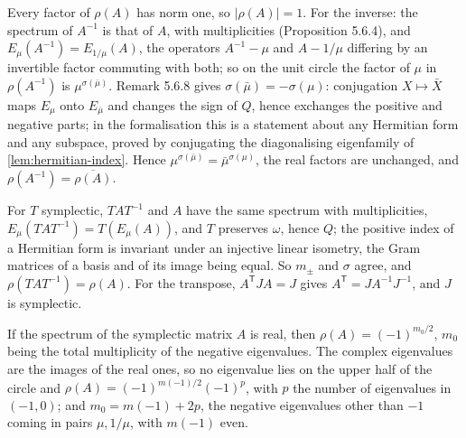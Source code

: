 \begin{proposition}[$\rho$ takes unit values, and $\rho(A^{-1}) = \overline{\rho(A)}$]
  \label{prop:rho-norm-inv}
  \leanok
  Every factor of $\rho(A)$ has norm one, so $\lvert\rho(A)\rvert = 1$.  For the
  inverse: the spectrum of $A^{-1}$ is that of $A$, with multiplicities
  (Proposition 5.6.4), and $E_\mu(A^{-1}) = E_{1/\mu}(A)$, the operators
  $A^{-1} - \mu$ and $A - 1/\mu$ differing by an invertible factor commuting
  with both; so on the unit circle the factor of $\mu$ in $\rho(A^{-1})$ is
  $\mu^{\sigma(\bar\mu)}$.  Remark 5.6.8 gives $\sigma(\bar\mu) = -\sigma(\mu)$:
  conjugation $X \mapsto \bar X$ maps $E_\mu$ onto $E_{\bar\mu}$ and changes the
  sign of $Q$, hence exchanges the positive and negative parts; in the
  formalisation this is a statement about any Hermitian form and any subspace,
  proved by conjugating the diagonalising eigenfamily of
  \ref{lem:hermitian-index}.  Hence $\mu^{\sigma(\bar\mu)} =
  \bar\mu^{\sigma(\mu)}$, the real factors are unchanged, and
  $\rho(A^{-1}) = \overline{\rho(A)}$.
\end{proposition}

\begin{proposition}[Naturality of $\rho$, and $\rho(A^{\mathsf T}) = \rho(A^{-1})$]
  \label{prop:rho-naturality}
  \leanok
  For $T$ symplectic, $TAT^{-1}$ and $A$ have the same spectrum with
  multiplicities, $E_\mu(TAT^{-1}) = T(E_\mu(A))$, and $T$ preserves $\omega$,
  hence $Q$; the positive index of a Hermitian form is invariant under an
  injective linear isometry, the Gram matrices of a basis and of its image
  being equal.  So $m_\pm$ and $\sigma$ agree, and $\rho(TAT^{-1}) = \rho(A)$.
  For the transpose, $A^{\mathsf T} J A = J$ gives
  $A^{\mathsf T} = J A^{-1} J^{-1}$, and $J$ is symplectic.
\end{proposition}

\begin{proposition}
  \label{prop:rho-normalisation}
  \leanok
  If the spectrum of the symplectic matrix $A$ is real, then
  $\rho(A) = (-1)^{m_0/2}$, $m_0$ being the total multiplicity of the negative
  eigenvalues.  The complex eigenvalues are the images of the real ones, so no
  eigenvalue lies on the upper half of the circle and
  $\rho(A) = (-1)^{m(-1)/2}(-1)^{p}$, with $p$ the number of eigenvalues in
  $(-1, 0)$; and $m_0 = m(-1) + 2p$, the negative eigenvalues other than $-1$
  coming in pairs $\mu, 1/\mu$, with $m(-1)$ even.
\end{proposition}

